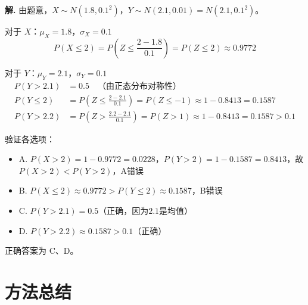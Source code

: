 \documentclass[11pt]{ctexrep}
\begin{document}
\textbf{解.} 由题意，$X \sim N(1.8, 0.1^2)$，$Y \sim N(2.1, 0.01) = N(2.1, 0.1^2)$。

对于 $X$：$\mu_X = 1.8$，$\sigma_X = 0.1$
\[
P(X \le 2) = P\left(Z \le \frac{2-1.8}{0.1}\right) = P(Z \le 2) \approx 0.9772
\]

对于 $Y$：$\mu_Y = 2.1$，$\sigma_Y = 0.1$
\begin{align*}
P(Y > 2.1) &= 0.5 \quad \text{（由正态分布对称性）} \\
P(Y \le 2) &= P\left(Z \le \frac{2-2.1}{0.1}\right) = P(Z \le -1) \approx 1 - 0.8413 = 0.1587 \\
P(Y > 2.2) &= P\left(Z > \frac{2.2-2.1}{0.1}\right) = P(Z > 1) \approx 1 - 0.8413 = 0.1587 > 0.1
\end{align*}

验证各选项：
\begin{itemize}
    \item A. $P(X > 2) = 1 - 0.9772 = 0.0228$，$P(Y > 2) = 1 - 0.1587 = 0.8413$，故 $P(X > 2) < P(Y > 2)$，A错误
    \item B. $P(X \le 2) \approx 0.9772 > P(Y \le 2) \approx 0.1587$，B错误
    \item C. $P(Y > 2.1) = 0.5$（正确，因为$2.1$是均值）
    \item D. $P(Y > 2.2) \approx 0.1587 > 0.1$（正确）
\end{itemize}

正确答案为 C、D。

\section*{方法总结}
\end{document}
